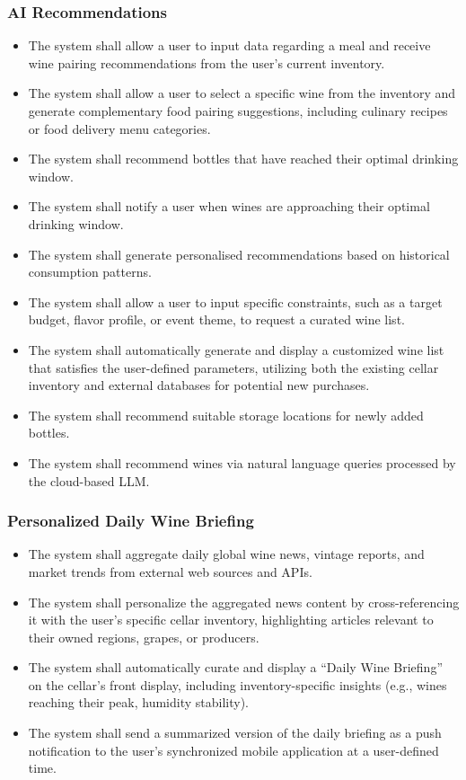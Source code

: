 \documentclass[conference]{IEEEtran}
\begin{document}
\subsubsection{AI Recommendations}
\begin{itemize}
    \item The system shall allow a user to input data regarding a meal and receive wine pairing recommendations from the user's current inventory.
    \item The system shall allow a user to select a specific wine from the inventory and generate complementary food pairing suggestions, including culinary recipes or food delivery menu categories.
    \item The system shall recommend bottles that have reached their optimal drinking window.
    \item The system shall notify a user when wines are approaching their optimal drinking window.
    \item The system shall generate personalised recommendations based on historical consumption patterns.
    \item The system shall allow a user to input specific constraints, such as a target budget, flavor profile, or event theme, to request a curated wine list.
    \item The system shall automatically generate and display a customized wine list that satisfies the user-defined parameters, utilizing both the existing cellar inventory and external databases for potential new purchases.
    \item The system shall recommend suitable storage locations for newly added bottles.
    \item The system shall recommend wines via natural language queries processed by the cloud-based LLM.
\end{itemize}

\subsubsection{Personalized Daily Wine Briefing}
\begin{itemize}
    \item The system shall aggregate daily global wine news, vintage reports, and market trends from external web sources and APIs.
    \item The system shall personalize the aggregated news content by cross-referencing it with the user's specific cellar inventory, highlighting articles relevant to their owned regions, grapes, or producers.
    \item The system shall automatically curate and display a ``Daily Wine Briefing'' on the cellar's front display, including inventory-specific insights (e.g., wines reaching their peak, humidity stability).
    \item The system shall send a summarized version of the daily briefing as a push notification to the user's synchronized mobile application at a user-defined time.
\end{itemize}
\end{document}
